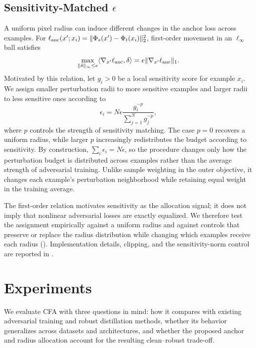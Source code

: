 \documentclass{article} %
\theoremstyle{plain}
\begin{document}
\subsection{Sensitivity-Matched \(\epsilon\)}
\label{sec:angeps}
A uniform pixel radius can induce different changes in the anchor loss across
examples. For
\(\ell_{\rm anc}(x';x_i)=\|\Phi_s(x')-\Phi_t(x_i)\|_2^2\), first-order
movement in an \(\ell_\infty\) ball satisfies
\begin{equation}
\max_{\|\delta\|_\infty\le e}\langle\nabla_{x'}\ell_{\rm anc},\delta\rangle
=e\|\nabla_{x'}\ell_{\rm anc}\|_1.
\label{eqn:firstorder}
\end{equation}
Motivated by this relation, let \(g_i>0\) be a local sensitivity score for
example \(x_i\). We assign smaller perturbation radii to more sensitive
examples and larger radii to less sensitive ones according to
\begin{equation}
\epsilon_i=N\epsilon\frac{g_i^{-p}}{\sum_{j=1}^N g_j^{-p}},
\label{eqn:angeps_ideal}
\end{equation}
where \(p\) controls the strength of sensitivity matching. The case \(p=0\)
recovers a uniform radius, while larger \(p\) increasingly redistributes the
budget according to sensitivity. By construction,
\(\sum_i\epsilon_i=N\epsilon\), so the procedure changes only how the
perturbation budget is distributed across examples rather than the average
strength of adversarial training. Unlike sample weighting in the outer
objective, it changes each example's perturbation neighborhood while retaining
equal weight in the training average.

The first-order relation motivates sensitivity as the allocation signal; it
does not imply that nonlinear adversarial losses are exactly equalized. We
therefore test the assignment empirically against a uniform radius and against
controls that preserve or replace the radius distribution while changing
which examples receive each radius (). Implementation
details, clipping, and the sensitivity-norm control are reported in
.

\section{Experiments}
\label{sec:exp}

We evaluate CFA with three questions in mind: how it compares with existing adversarial training and robust distillation methods, whether its behavior generalizes across datasets and architectures, and whether the proposed anchor and radius allocation account for the resulting clean--robust trade-off.
\end{document}
